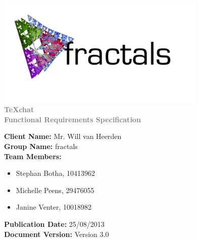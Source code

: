 \documentclass[11pt,a4paper]{moderncv}
\begin{document}
		\fontsize{36pt}{36pt}\selectfont
		\begin{center}
		\includegraphics[width=10cm]{./logo2.jpg}
			\textbf{\textcolor{gray}{\\TeXchat}}
			\textbf{\textcolor{gray}{\\Functional Requirements Specification}}
		\vspace*{\fill}
		\end{center}
		
		\fontsize{12pt}{12pt}\selectfont
		\textbf{Client Name:} Mr. Will van Heerden\\
		\textbf{Group Name:} fractals\\
		\textbf{Team Members:}
			\begin{itemize}
				\item Stephan Botha, 10413962
				\item Michelle Peens, 29476055
				\item Janine Venter, 10018982	
			\end{itemize}
		\textbf{Publication Date:} 25/08/2013\\
		\textbf{Document Version:} Version 3.0
		
\end{document}
